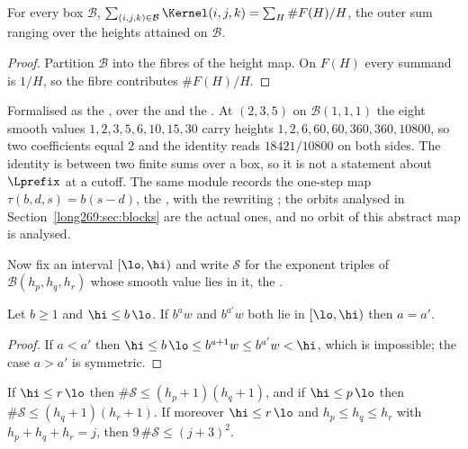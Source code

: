 \begin{proposition}\label{long269:res:fibre}
For every box $\mathcal B$,
$\sum_{(i,j,k)\in\mathcal B}\Kernel(i,j,k)=\sum_{H}\#F(H)/H$, the outer sum
ranging over the heights attained on $\mathcal B$.
\end{proposition}

\begin{proof}
Partition $\mathcal B$ into the fibres of the height map.  On $F(H)$ every
summand is $1/H$, so the fibre contributes $\#F(H)/H$.
\end{proof}

\noindent Formalised as the
, over the
 and the
.  At $(2,3,5)$ on $\mathcal B(1,1,1)$ the eight smooth values
$1,2,3,5,6,10,15,30$ carry heights $1,2,6,60,60,360,360,10800$, so two
coefficients equal $2$ and the identity reads $18421/10800$ on both sides.  The
identity is between two finite sums over a box, so it is not a statement about
$\Lprefix$ at a cutoff.  The same module records the one-step map
$\tau(b,d,s)=b(s-d)$, the
, with the rewriting
; the orbits analysed in Section~\ref{long269:sec:blocks} are the actual
ones, and no orbit of this abstract map is analysed.

Now fix an interval $[\lo,\hi)$ and write $\mathcal S$ for the exponent triples
of $\mathcal B(h_p,h_q,h_r)$ whose smooth value lies in it, the
.

\begin{lemma}\label{long269:res:short}
Let $b\ge1$ and $\hi\le b\,\lo$.  If $b^{a}w$ and $b^{a'}w$ both lie in
$[\lo,\hi)$ then $a=a'$.
\end{lemma}

\begin{proof}
If $a<a'$ then $\hi\le b\,\lo\le b^{a+1}w\le b^{a'}w<\hi$, which is impossible;
the case $a>a'$ is symmetric.
\end{proof}

\begin{proposition}\label{long269:res:drop}
\label{long269:res:shell}
If $\hi\le r\,\lo$ then $\#\mathcal S\le(h_p+1)(h_q+1)$, and if
$\hi\le p\,\lo$ then $\#\mathcal S\le(h_q+1)(h_r+1)$.  If moreover
$\hi\le r\,\lo$ and $h_p\le h_q\le h_r$ with $h_p+h_q+h_r=j$, then
$9\,\#\mathcal S\le(j+3)^{2}$.
\end{proposition}

